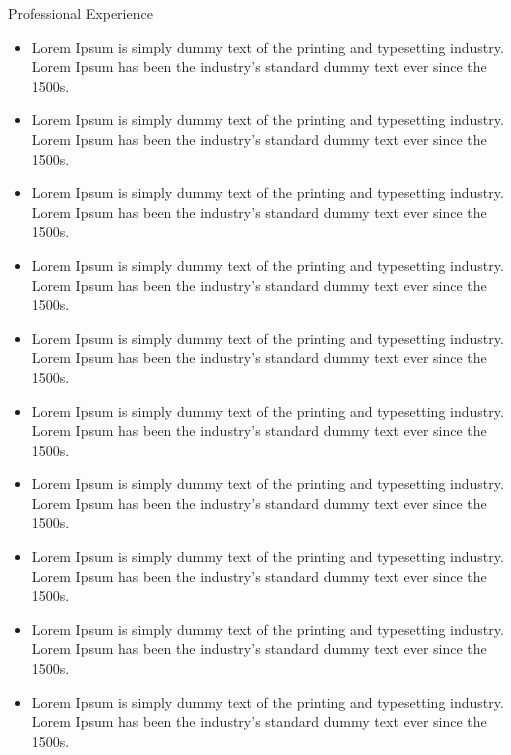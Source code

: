 \documentclass{resume}
\begin{document}
\begin{experienceSection}{Professional Experience}
    \experienceItem[
        company={Yellow.Ai},
        location={Bengaluru, IN},
        position={Software Engineer},
        duration={Sep 2021 – Jul 2023}
    ]
    \begin{itemize}
    \itemsep -6pt {}
    \item Lorem Ipsum is simply dummy text of the printing and typesetting industry. Lorem Ipsum has been the industry's standard dummy text ever since the 1500s.
    \item Lorem Ipsum is simply dummy text of the printing and typesetting industry. Lorem Ipsum has been the industry's standard dummy text ever since the 1500s.
    \item Lorem Ipsum is simply dummy text of the printing and typesetting industry. Lorem Ipsum has been the industry's standard dummy text ever since the 1500s.
    \item Lorem Ipsum is simply dummy text of the printing and typesetting industry. Lorem Ipsum has been the industry's standard dummy text ever since the 1500s.
    \item Lorem Ipsum is simply dummy text of the printing and typesetting industry. Lorem Ipsum has been the industry's standard dummy text ever since the 1500s.
    \end{itemize}

    \experienceItem[
        company={Cognizant},
        location={Coimbatore, In},
        position={Program Trainee Analyst },
        duration={Mar 2021 – Aug 2021}
    ]
    \begin{itemize}
    \itemsep -6pt {}
    \item Lorem Ipsum is simply dummy text of the printing and typesetting industry. Lorem Ipsum has been the industry's standard dummy text ever since the 1500s.
    \item Lorem Ipsum is simply dummy text of the printing and typesetting industry. Lorem Ipsum has been the industry's standard dummy text ever since the 1500s.
    \item Lorem Ipsum is simply dummy text of the printing and typesetting industry. Lorem Ipsum has been the industry's standard dummy text ever since the 1500s.
    \item Lorem Ipsum is simply dummy text of the printing and typesetting industry. Lorem Ipsum has been the industry's standard dummy text ever since the 1500s.
    \item Lorem Ipsum is simply dummy text of the printing and typesetting industry. Lorem Ipsum has been the industry's standard dummy text ever since the 1500s.
    \end{itemize}

\end{experienceSection}
\end{document}
